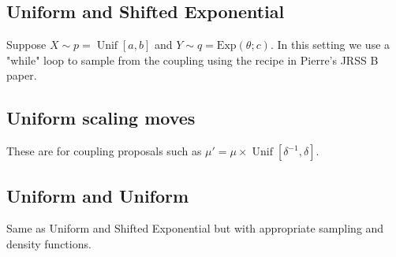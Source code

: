 \documentclass[11pt,a4paper]{article}
\newcommand{\Exp}[1]{\mathrm{Exp}(#1)}
\DeclareMathOperator*{\Unif}{\mathrm{Unif}}
\begin{document}
\subsection*{Uniform and Shifted Exponential}

Suppose $ X \sim p = \Unif[a, b] $ and $ Y \sim q = \Exp{\theta; c} $. In this setting we use a "while" loop to sample from the coupling using the recipe in Pierre's JRSS B paper.



\subsection*{Uniform scaling moves}

These are for coupling proposals such as $ \mu' = \mu \times \Unif[\delta^{-1}, \delta] $.



\subsection*{Uniform and Uniform}

Same as Uniform and Shifted Exponential but with appropriate sampling and density functions.


\end{document}
